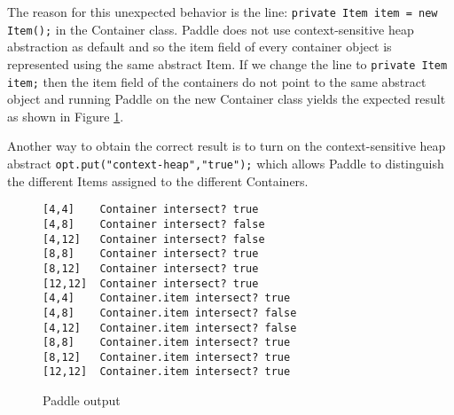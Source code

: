 \documentclass{article}
\newcommand{\code}[1]{\texttt{\small #1}}
\begin{document}
The reason for this unexpected behavior is the line: \code{private
Item item = new Item();} in the Container class. Paddle does not use
context-sensitive heap abstraction as default and so the item field of
every container object is represented using the same abstract Item. If
we change the line to \code{private Item item;} then the item field of
the containers do not point to the same abstract object and running
Paddle on the new Container class yields the expected result as shown
in Figure \ref{fig:paddle:test1:expectedoutput}.

Another way to obtain the correct result is to turn on the
context-sensitive heap abstract \code{opt.put("context-heap","true");}
which allows Paddle to distinguish the different Items assigned to the
different Containers.\\

\begin{figure}[htb]
  \centering
  \begin{verbatim}
[4,4]    Container intersect? true
[4,8]    Container intersect? false
[4,12]   Container intersect? false
[8,8]    Container intersect? true
[8,12]   Container intersect? true
[12,12]  Container intersect? true
[4,4]    Container.item intersect? true
[4,8]    Container.item intersect? false
[4,12]   Container.item intersect? false
[8,8]    Container.item intersect? true
[8,12]   Container.item intersect? true
[12,12]  Container.item intersect? true
  \end{verbatim}
  \caption{Paddle output}
  \label{fig:paddle:test1:expectedoutput}
\end{figure}


                
                
\end{document}
